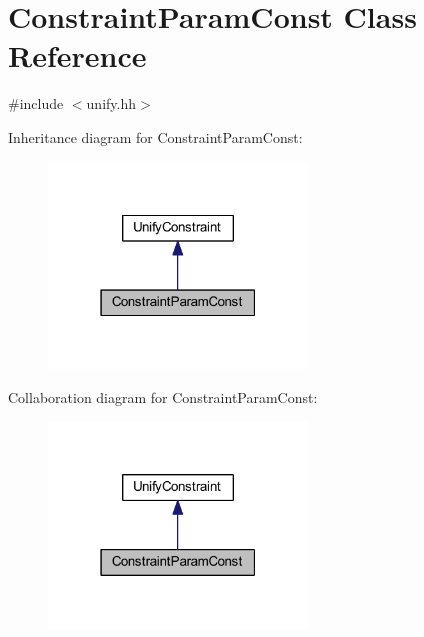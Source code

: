 \hypertarget{class_constraint_param_const}{}\section{Constraint\+Param\+Const Class Reference}
\label{class_constraint_param_const}


{\ttfamily \#include $<$unify.\+hh$>$}



Inheritance diagram for Constraint\+Param\+Const\+:
\nopagebreak
\begin{figure}[H]
\begin{center}
\leavevmode
\includegraphics[width=195pt]{class_constraint_param_const__inherit__graph}
\end{center}
\end{figure}


Collaboration diagram for Constraint\+Param\+Const\+:
\nopagebreak
\begin{figure}[H]
\begin{center}
\leavevmode
\includegraphics[width=195pt]{class_constraint_param_const__coll__graph}
\end{center}
\end{figure}
